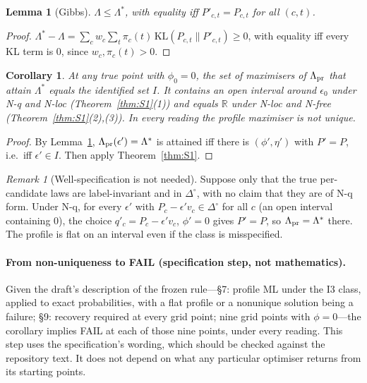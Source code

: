 \documentclass[11pt,a4paper]{article}
\newtheorem{lemma}[theorem]{Lemma}
\newtheorem{corollary}[theorem]{Corollary}
\theoremstyle{definition}
\theoremstyle{remark}
\newtheorem{remark}[theorem]{Remark}
\newcommand{\R}{\mathbb{R}}
\newcommand{\simp}{\Delta^{\circ}}
\newcommand{\eps}{\epsilon}
\begin{document}
\begin{lemma}[Gibbs]\label{lem:gibbs}
$\Lambda\le\Lambda^*$, with equality iff $P'_{c,t}=P_{c,t}$ for all $(c,t)$.
\end{lemma}
\begin{proof}
$\Lambda^*-\Lambda=\sum_cw_c\sum_t\pi_c(t)\,\mathrm{KL}(P_{c,t}\|P'_{c,t})\ge0$, with
equality iff every KL term is $0$, since $w_c,\pi_c(t)>0$.
\end{proof}

\begin{corollary}\label{cor:gate}
At any true point with $\phi_0=0$, the set of maximisers of $\Lambda_{\rm pr}$ that
attain $\Lambda^*$ equals the identified set $I$. It contains an open interval
around $\eps_0$ under N-q and N-loc (Theorem~\ref{thm:S1}(1)) and equals $\R$ under
N-loc and N-free (Theorem~\ref{thm:S1}(2),(3)). In every reading the profile
maximiser is not unique.
\end{corollary}
\begin{proof}
By Lemma~\ref{lem:gibbs}, $\Lambda_{\rm pr}(\eps')=\Lambda^*$ is attained iff there is
$(\phi',\eta')$ with $P'=P$, i.e.\ iff $\eps'\in I$. Then apply Theorem~\ref{thm:S1}.
\end{proof}

\begin{remark}[Well-specification is not needed]
Suppose only that the true per-candidate laws are label-invariant and in $\simp$, with
no claim that they are of N-q form. Under N-q, for every $\eps'$ with
$P_c-\eps'v_c\in\simp$ for all $c$ (an open interval containing $0$), the choice
$q'_c=P_c-\eps'v_c$, $\phi'=0$ gives $P'=P$, so $\Lambda_{\rm pr}=\Lambda^*$ there. The
profile is flat on an interval even if the class is misspecified.
\end{remark}

\paragraph{From non-uniqueness to FAIL (specification step, not mathematics).}
Given the draft's description of the frozen rule---§7: profile ML under the I3 class,
applied to exact probabilities, with a flat profile or a nonunique solution being a
failure; §9: recovery required at every grid point; nine grid points with $\phi=0$---the
corollary implies FAIL at each of those nine points, under every reading. This step
uses the specification's wording, which should be checked against the repository text.
It does not depend on what any particular optimiser returns from its starting points.
\end{document}
